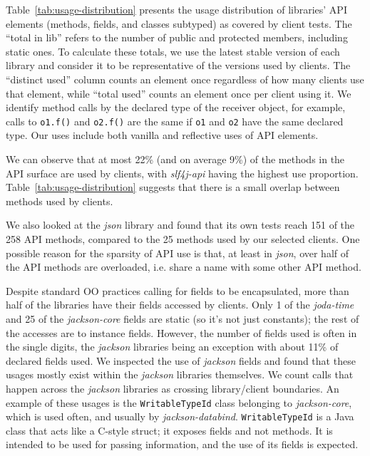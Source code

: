 Table~\ref{tab:usage-distribution} presents the usage distribution of
libraries' API elements (methods, fields, and classes subtyped) as
covered by client tests. The ``total in lib'' refers to the number of
public and protected members, including static ones. To calculate these totals,
we use the latest stable version of each library and consider it to be representative of 
the versions used by clients.  The ``distinct used'' column counts an
element once regardless of how many clients use that element, while
``total used'' counts an element once per client using it. We identify method calls by the
declared type of the receiver object, for example, calls to {\tt o1.f()} and {\tt o2.f()} are the same
if {\tt o1} and {\tt o2} have the same declared type.
Our uses 
include both vanilla and reflective uses of API elements.



We can observe that at most 22\% (and on average 9\%) of the methods in the API surface
are used by clients, with \emph{slf4j-api} having the highest use proportion.
Table~\ref{tab:usage-distribution} suggests that there is a small overlap between methods
used by clients.

We also looked at the \emph{json} library and found that its own tests reach 151
of the 258 API methods, compared to the 25 methods used by our selected
clients. One possible reason for the sparsity of API use is that, at least in \emph{json}, over half of the API methods are overloaded, i.e. share a name with
some other API method.

Despite standard OO practices calling for fields to be encapsulated, more than half of the libraries have their fields accessed by clients. Only 1 of the \emph{joda-time} and 25 of the \emph{jackson-core} fields are static (so it's not just constants); the rest of the accesses are to instance fields.
However, the number of fields used is often in the single digits,
the \emph{jackson} libraries being an exception with about 11\% of declared fields used.
We inspected the use of \emph{jackson} fields and found that these usages mostly exist within the \emph{jackson} libraries themselves.
We count calls that happen across the \emph{jackson} libraries as crossing library/client boundaries.
An example of these usages is the {\tt WritableTypeId} class belonging to \emph{jackson-core}, which is used often, and usually by \emph{jackson-databind}.
{\tt WritableTypeId} is a Java class that acts like a C-style struct; it exposes fields and not methods. It is intended to be used for passing information, and the use of its fields is expected.

